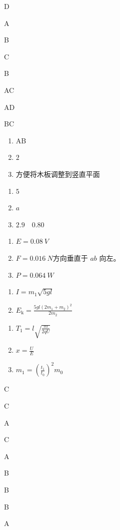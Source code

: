 \item D
\item A
\item B
\item C
\item B
\item AC
\item AD
\item BC
\item \begin {enumerate} \item AB \item $ 2 $ \item 方便将木板调整到竖直平面 \end {enumerate}
\item \begin {enumerate} \item $ 5 $ \item $ a $ \item $ 2.9 \quad 0.80 $ \end {enumerate}
\item \begin {enumerate} \item $E=0.08 \ V$ \item $F=0.016 \ N$方向垂直于 $a b$ 向左。 \item $P=0.064 \ W$ \end {enumerate}
\item \begin {enumerate} \item $I=m_{1} \sqrt {5 g l}$ \item $E_{\mathrm {k}}=\frac {5 g l\left (2 m_{1}+m_{2}\right )^{2}}{2 m_{2}}$ \end {enumerate}
\item \begin {enumerate} \item $T_{1}=l\sqrt {\frac {m}{2 q U}}$ \item $x=\frac {U}{E}$ \item $m_{1}=\left (\frac {t_{1}}{t_{0}}\right )^{2} m_{0}$ \end {enumerate}
\item C
\item C
\item A
\item C
\item A
\item B
\item B
\item B
\item A
